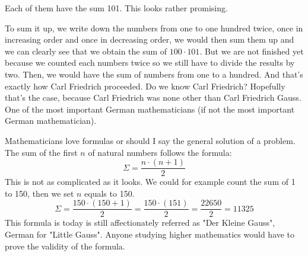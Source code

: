 \noindent Each of them have the sum 101. This looks rather promising. 

\vspace{5mm} %

\noindent To sum it up, we write down the numbers from one to one hundred twice, once in increasing order and once in decreasing order, we would then sum them up and we can clearly see that we obtain the sum of $100 \cdot 101$. But we are not finished yet because we counted each numbers twice so we still have to divide the results by two. Then, we would have the sum of numbers from one to a hundred. And that's exactly how Carl Friedrich proceeded. Do we know Carl Friedrich? Hopefully that's the case, because Carl Friedrich was none other than Carl Friedrich Gauss. One of the most important German mathematicians (if not the most important German mathematician).

\vspace{5mm} %


\vspace{5mm} %

\noindent Mathematicians love formulas or should I say the general solution of a problem. The sum of the first $n$ of natural numbers follows the formula:
\begin{equation}
\Sigma = \frac{n\cdot(n+1)}{2}
\end{equation}
\noindent This is not as complicated as it looks. We could for example count the sum of 1 to 150, then we set $n$ equals to 150.
\begin{equation}
\Sigma = \frac{150\cdot(150+1)}{2}= \frac{150\cdot(151)}{2}= \frac{22650}{2}=11325
\end{equation}
\noindent This formula is today is still affectionately referred as "Der Kleine Gauss", German for "Little Gauss". Anyone studying higher mathematics would have to prove the validity of the formula.